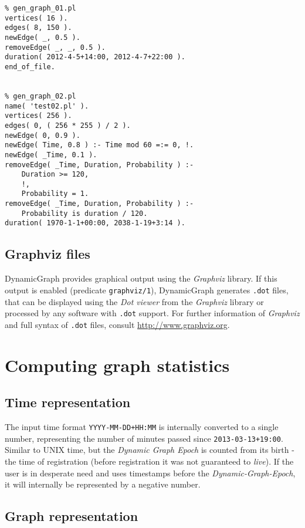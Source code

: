 \documentclass[11pt, a4paper]{article}
\newcommand{\pl}[1]{\texttt{#1}} %
\theoremstyle{plain}
\theoremstyle{definition}
\theoremstyle{remark}
\newcommand{\gv}{\textit{Graphviz}}
\begin{document}
\begin{verbatim}
% gen_graph_01.pl
vertices( 16 ).
edges( 8, 150 ).
newEdge( _, 0.5 ).
removeEdge( _, _, 0.5 ).
duration( 2012-4-5+14:00, 2012-4-7+22:00 ).
end_of_file.


% gen_graph_02.pl
name( 'test02.pl' ).
vertices( 256 ).
edges( 0, ( 256 * 255 ) / 2 ).
newEdge( 0, 0.9 ).
newEdge( Time, 0.8 ) :- Time mod 60 =:= 0, !.
newEdge( _Time, 0.1 ).
removeEdge( _Time, Duration, Probability ) :-
    Duration >= 120,
    !,
    Probability = 1.
removeEdge( _Time, Duration, Probability ) :-
    Probability is duration / 120.
duration( 1970-1-1+00:00, 2038-1-19+3:14 ).
\end{verbatim}

\subsection{Graphviz files}
\label{sec:files-graphviz}

DynamicGraph provides graphical output using the \gv{} library. 
If this output is enabled (predicate \pl{graphviz/1}), DynamicGraph generates \pl{.dot} files, 
that can be displayed using the \textit{Dot viewer} from the \gv{} library or processed
by any software with \texttt{.dot} support.
For further information of \gv{} and full syntax of \pl{.dot} files, consult \url{http://www.graphviz.org}.

\section{Computing graph statistics}
\label{sec:computing}



\subsection{Time representation}
\label{sec:computing-time}

The input time format \pl{YYYY-MM-DD+HH:MM} is internally converted to a single number,
representing the number of minutes passed since \pl{2013-03-13+19:00}. 
Similar to UNIX time, but the \textit{Dynamic Graph Epoch} is counted from its birth - the time of registration
(before registration it was not guaranteed to \textit{live}).
If the user is in desperate need and uses timestamps before the \textit{Dynamic-Graph-Epoch}, 
it will internally be represented by a negative number.

\subsection{Graph representation}
\label{sec:computing-graph} 
\end{document}
